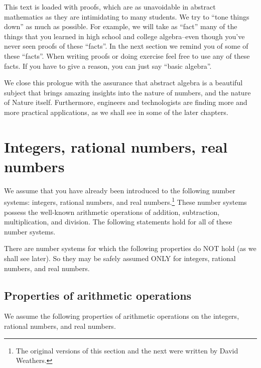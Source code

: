 This text is loaded with proofs, which are as unavoidable in abstract mathematics as they are intimidating to many students. We try to ``tone things down'' as much as possible. For example, we will take as ``fact'' many of the things that you learned in high school and  college algebra--even though you've never seen proofs of these ``facts''.  In the next section  we remind you of some of these ``facts''.  When writing proofs or doing exercise feel free to use any of these facts.  If you have to give a reason, you can just say  ``basic algebra''.

We close this prologue with the assurance that abstract algebra is a beautiful subject that brings amazing insights into the nature of numbers, and the nature of Nature itself. Furthermore, engineers and technologists are finding more and more practical applications, as we shall see in some of the later chapters.



\section{Integers, rational numbers, real numbers}



We assume that you have already been introduced to the following number systems: integers, rational numbers, and real numbers.\footnote{The original versions of this section and the next were written by David Weathers.}  These number systems possess the well-known arithmetic operations of addition, subtraction, multiplication, and division. The following statements hold for all of these number systems. 

\begin{warn}
There are number systems for which the following properties do NOT hold (as we shall see later). So they may be safely assumed ONLY for integers, rational numbers, and real numbers.
\end{warn}

\subsection{Properties of arithmetic operations}\label{OpsAndRels}

We assume the following properties of arithmetic operations on the integers, rational numbers, and real numbers.

